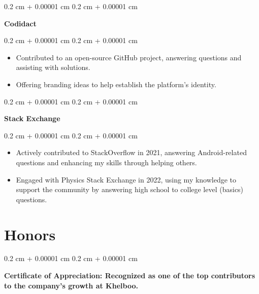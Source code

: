 \documentclass[10pt, letterpaper]{article}
\newenvironment{highlights}{
    \begin{itemize}[
        topsep=0.10 cm,
        parsep=0.10 cm,
        partopsep=0pt,
        itemsep=0pt,
        leftmargin=0.4 cm + 10pt
    ]
}{
    \end{itemize}
} %
\newenvironment{onecolentry}{
    \begin{adjustwidth}{
        0.2 cm + 0.00001 cm
    }{
        0.2 cm + 0.00001 cm
    }
}{
    \end{adjustwidth}
} %
\begin{document}
        
        \begin{onecolentry}
            \textbf{Codidact}
        \end{onecolentry}

        \vspace{0.10 cm}
        \begin{onecolentry}
            \begin{highlights}
                \item Contributed to an open-source GitHub project, answering questions and assisting with solutions.
                \item Offering branding ideas to help establish the platform’s identity.
            \end{highlights}
        \end{onecolentry}


        \vspace{0.2 cm}

        \begin{onecolentry}
            \textbf{Stack Exchange}
        \end{onecolentry}

        \vspace{0.10 cm}
        \begin{onecolentry}
            \begin{highlights}
                \item Actively contributed to StackOverflow in 2021, answering Android-related questions and enhancing my skills through helping others.
                \item Engaged with Physics Stack Exchange in 2022, using my knowledge to support the community by answering high school to college level (basics) questions.
            \end{highlights}
        \end{onecolentry}



    
    \section{Honors}



        
        \begin{onecolentry}
            \textbf{Certificate of Appreciation: Recognized as one of the top contributors to the company's growth at Khelboo.}
        \end{onecolentry}
\end{document}
